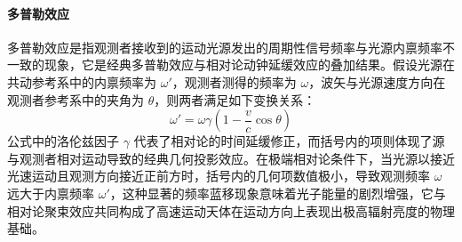 \paragraph{多普勒效应}
多普勒效应是指观测者接收到的运动光源发出的周期性信号频率与光源内禀频率不一致的现象，它是经典多普勒效应与相对论动钟延缓效应的叠加结果。假设光源在共动参考系中的内禀频率为 $\omega'$，观测者测得的频率为 $\omega$，波矢与光源速度方向在观测者参考系中的夹角为 $\theta$，则两者满足如下变换关系：
\begin{equation*}
\boxed{\omega' = \omega \gamma \left( 1 - \frac{v}{c} \cos \theta \right)}
\end{equation*}
公式中的洛伦兹因子 $\gamma$ 代表了相对论的时间延缓修正，而括号内的项则体现了源与观测者相对运动导致的经典几何投影效应。在极端相对论条件下，当光源以接近光速运动且观测方向接近正前方时，括号内的几何项数值极小，导致观测频率 $\omega$ 远大于内禀频率 $\omega'$，这种显著的频率蓝移现象意味着光子能量的剧烈增强，它与相对论聚束效应共同构成了高速运动天体在运动方向上表现出极高辐射亮度的物理基础。